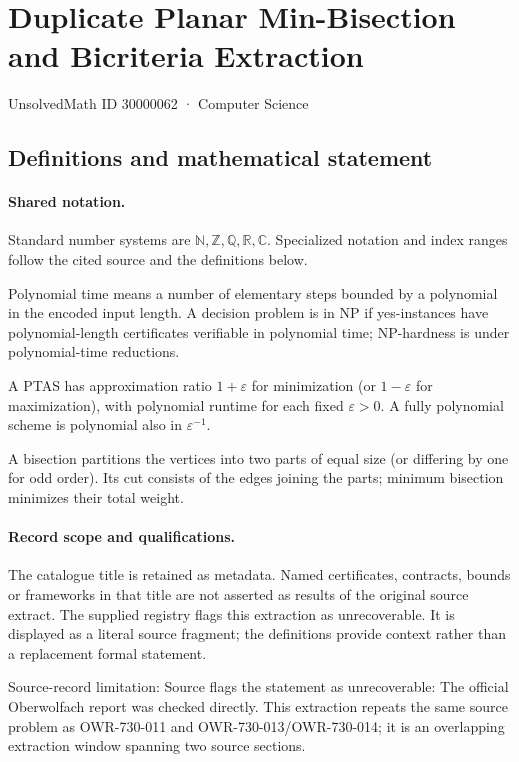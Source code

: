 \documentclass[11pt]{article}
\begin{document}
\setcounter{section}{30000061}
\section{Duplicate Planar Min-Bisection and Bicriteria Extraction}\label{30000062}
{\small\sffamily UnsolvedMath ID 30000062 · Computer Science}
\subsection{Definitions and mathematical statement}

\paragraph{Shared notation.}Standard number systems are $\mathbb N,\mathbb Z,\mathbb Q,\mathbb R,\mathbb C$. Specialized notation and index ranges follow the cited source and the definitions below.


Polynomial time means a number of elementary steps bounded by a polynomial in the encoded input length. A decision problem is in $\mathrm{NP}$ if yes-instances have polynomial-length certificates verifiable in polynomial time; NP-hardness is under polynomial-time reductions.

A PTAS has approximation ratio $1+\varepsilon$ for minimization (or $1-\varepsilon$ for maximization), with polynomial runtime for each fixed $\varepsilon>0$. A fully polynomial scheme is polynomial also in $\varepsilon^{-1}$.

A bisection partitions the vertices into two parts of equal size (or differing by one for odd order). Its cut consists of the edges joining the parts; minimum bisection minimizes their total weight.
\paragraph{Record scope and qualifications.}
The catalogue title is retained as metadata. Named certificates, contracts, bounds or frameworks in that title are not asserted as results of the original source extract.
The supplied registry flags this extraction as unrecoverable. It is displayed as a literal source fragment; the definitions provide context rather than a replacement formal statement.

Source-record limitation: Source flags the statement as unrecoverable: The official Oberwolfach report was checked directly. This extraction repeats the same source problem as OWR-730-011 and OWR-730-013/OWR-730-014; it is an overlapping extraction window spanning two source sections.
\end{document}
